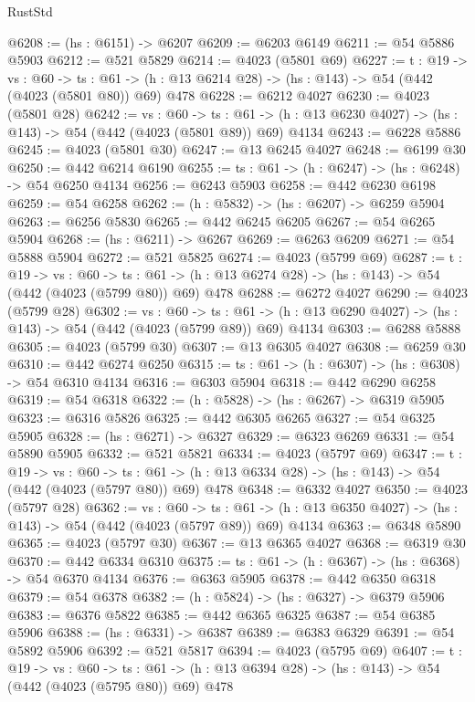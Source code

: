 \begin{lexlean}{RustStd}
\begin{coremodule}
@6208 := (hs : @6151) -> @6207
@6209 := @6203 @6149
@6211 := @54 @5886 @5903
@6212 := @521 @5829
@6214 := @4023 (@5801 @69)
@6227 := {t : @19} ->
  {vs : @60} ->
  {ts : @61} -> (h : @13 @6214 @28) -> (hs : @143) -> @54 (@442 (@4023 (@5801 @80)) @69) @478
@6228 := @6212 @4027
@6230 := @4023 (@5801 @28)
@6242 := {vs : @60} ->
  {ts : @61} -> (h : @13 @6230 @4027) -> (hs : @143) -> @54 (@442 (@4023 (@5801 @89)) @69) @4134
@6243 := @6228 @5886
@6245 := @4023 (@5801 @30)
@6247 := @13 @6245 @4027
@6248 := @6199 @30
@6250 := @442 @6214 @6190
@6255 := {ts : @61} -> (h : @6247) -> (hs : @6248) -> @54 @6250 @4134
@6256 := @6243 @5903
@6258 := @442 @6230 @6198
@6259 := @54 @6258
@6262 := (h : @5832) -> (hs : @6207) -> @6259 @5904
@6263 := @6256 @5830
@6265 := @442 @6245 @6205
@6267 := @54 @6265 @5904
@6268 := (hs : @6211) -> @6267
@6269 := @6263 @6209
@6271 := @54 @5888 @5904
@6272 := @521 @5825
@6274 := @4023 (@5799 @69)
@6287 := {t : @19} ->
  {vs : @60} ->
  {ts : @61} -> (h : @13 @6274 @28) -> (hs : @143) -> @54 (@442 (@4023 (@5799 @80)) @69) @478
@6288 := @6272 @4027
@6290 := @4023 (@5799 @28)
@6302 := {vs : @60} ->
  {ts : @61} -> (h : @13 @6290 @4027) -> (hs : @143) -> @54 (@442 (@4023 (@5799 @89)) @69) @4134
@6303 := @6288 @5888
@6305 := @4023 (@5799 @30)
@6307 := @13 @6305 @4027
@6308 := @6259 @30
@6310 := @442 @6274 @6250
@6315 := {ts : @61} -> (h : @6307) -> (hs : @6308) -> @54 @6310 @4134
@6316 := @6303 @5904
@6318 := @442 @6290 @6258
@6319 := @54 @6318
@6322 := (h : @5828) -> (hs : @6267) -> @6319 @5905
@6323 := @6316 @5826
@6325 := @442 @6305 @6265
@6327 := @54 @6325 @5905
@6328 := (hs : @6271) -> @6327
@6329 := @6323 @6269
@6331 := @54 @5890 @5905
@6332 := @521 @5821
@6334 := @4023 (@5797 @69)
@6347 := {t : @19} ->
  {vs : @60} ->
  {ts : @61} -> (h : @13 @6334 @28) -> (hs : @143) -> @54 (@442 (@4023 (@5797 @80)) @69) @478
@6348 := @6332 @4027
@6350 := @4023 (@5797 @28)
@6362 := {vs : @60} ->
  {ts : @61} -> (h : @13 @6350 @4027) -> (hs : @143) -> @54 (@442 (@4023 (@5797 @89)) @69) @4134
@6363 := @6348 @5890
@6365 := @4023 (@5797 @30)
@6367 := @13 @6365 @4027
@6368 := @6319 @30
@6370 := @442 @6334 @6310
@6375 := {ts : @61} -> (h : @6367) -> (hs : @6368) -> @54 @6370 @4134
@6376 := @6363 @5905
@6378 := @442 @6350 @6318
@6379 := @54 @6378
@6382 := (h : @5824) -> (hs : @6327) -> @6379 @5906
@6383 := @6376 @5822
@6385 := @442 @6365 @6325
@6387 := @54 @6385 @5906
@6388 := (hs : @6331) -> @6387
@6389 := @6383 @6329
@6391 := @54 @5892 @5906
@6392 := @521 @5817
@6394 := @4023 (@5795 @69)
@6407 := {t : @19} ->
  {vs : @60} ->
  {ts : @61} -> (h : @13 @6394 @28) -> (hs : @143) -> @54 (@442 (@4023 (@5795 @80)) @69) @478

\end{coremodule}
\end{lexlean}
